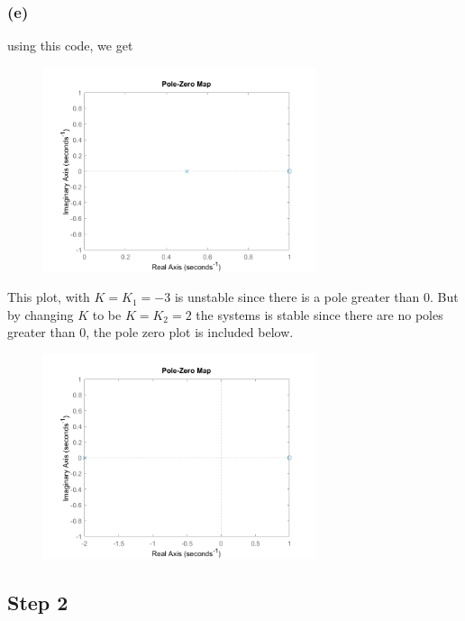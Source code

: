 \documentclass[12pt]{article}
\begin{document}
\subsubsection*{(e)}
using this code, we get

\begin{center}
\begin{figure}[h]\includegraphics[width=8cm]{fig1}
\end{figure}
This plot, with $K=K_1=-3$ is unstable since there is a pole greater than $0$. But by changing $K$ to be $K=K_2=2$ the systems is stable since there are no poles greater than 0, the pole zero plot is included below. 
\end{center}

\begin{center}
\begin{figure}[h]\includegraphics[width=8cm]{fig2}
\end{figure}
\end{center}
\subsection*{Step 2}
\end{document}

